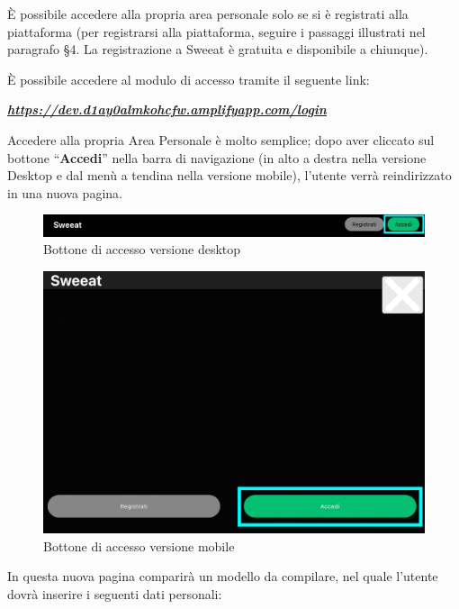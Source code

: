 
È possibile accedere alla propria area personale solo se si è registrati alla piattaforma (per registrarsi alla piattaforma, seguire i passaggi illustrati nel paragrafo \S{4}. La registrazione a Sweeat è gratuita e disponibile a chiunque).

È possibile accedere al modulo di accesso tramite il seguente link:

\begin{center}
\textsl{ \href{https://dev.d1ay0almkohcfw.amplifyapp.com/login}{\textbf{https://dev.d1ay0almkohcfw.amplifyapp.com/login} }}
\end{center}

Accedere alla propria Area Personale è molto semplice; dopo aver cliccato sul bottone “\textbf{Accedi}” nella barra di navigazione (in alto a destra nella versione Desktop e dal menù a tendina nella versione mobile), l’utente verrà reindirizzato in una nuova pagina.

\begin{figure}[H]
\centering
\includegraphics[scale=0.15]{./images/Login/LoginDesktop.png} 
\caption{Bottone di accesso versione desktop}
\end{figure}

\begin{figure}[H]
\centering
\includegraphics[scale=0.2]{./images/Login/LoginMobile.png} 
\caption{Bottone di accesso versione mobile}
\end{figure}

In questa nuova pagina comparirà un modello da compilare, nel quale l’utente dovrà inserire i seguenti dati personali:

